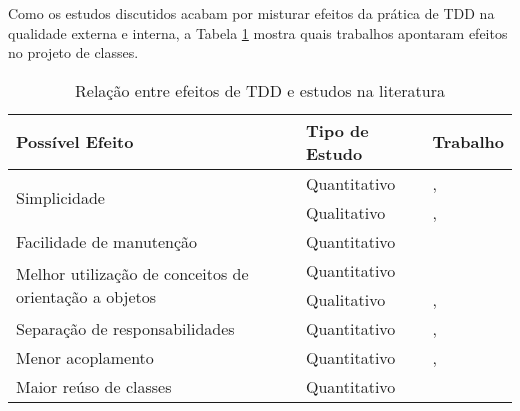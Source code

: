 Como os estudos discutidos acabam por misturar efeitos da prática de TDD na
qualidade externa e interna, a Tabela \ref{tab:comparativo} mostra
quais trabalhos apontaram efeitos no projeto de classes.

\begin{table}
	\centering
	\begin{tabular}{ | l | l | l |}
		
		\hline
		
		\textbf{Possível Efeito} & \textbf{Tipo de Estudo} & \textbf{Trabalho}\\

		\hline
		
		\multirow{2}{*}{Simplicidade}                          & Quantitativo & \cite{janzen-arch-improvement}, \cite{janzen-saiedian} \\
		\cline{2-3}
		                                           			   & Qualitativo  & \cite{angela-li}, \cite{george-e-williams}\\
		
		\hline
		
		Facilidade de manutenção                               & Quantitativo & \cite{langr}\\
		
		\hline
		
		\multirow{2}{*}{Melhor utilização de conceitos de orientação a objetos} & Quantitativo & \cite{janzen-saiedian}\\
		 													   & Qualitativo  & \cite{angela-li}, \cite{proulx}\\
		
		\hline
		
		Separação de responsabilidades                         & Quantitativo & \cite{janzen-saiedian}, \cite{steinberg}\\
		
		\hline
		
		Menor acoplamento                                      & Quantitativo & \cite{janzen-saiedian}, \cite{steinberg}\\
		
		\hline
		
		Maior reúso de classes                                 & Quantitativo & \cite{muller-e-hagner} \\

		\hline

	\end{tabular}
	\caption{Relação entre efeitos de TDD e estudos na literatura}
	\label{tab:comparativo}
\end{table}


